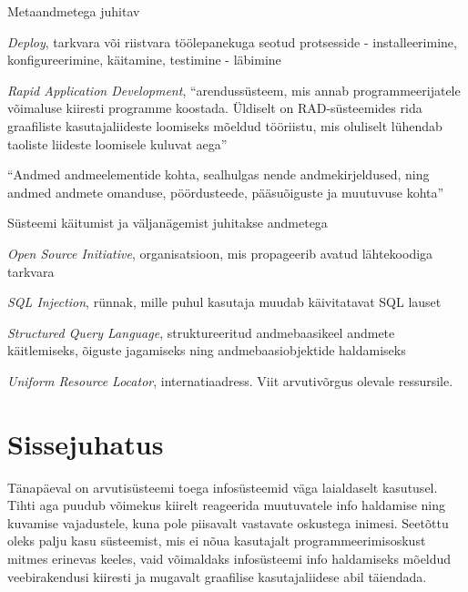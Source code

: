 \documentclass[a4paper,12pt]{article} %
\begin{document}
\begin{labeling}{Metaandmetega juhitav}
\item [Juurutama] \textit{Deploy}, tarkvara või riistvara töölepanekuga seotud protsesside - installeerimine, konfigureerimine, käitamine, testimine - läbimine \cite{Vallaste}
\item [Kiirprogrammeerimine] \textit{Rapid Application Development}, ``arendussüsteem, mis annab programmeerijatele võimaluse kiiresti programme koostada. Üldiselt on RAD-süsteemides rida graafiliste kasutajaliideste loomiseks mõeldud tööriistu, mis oluliselt lühendab taoliste liideste loomisele kuluvat aega'' \cite{Vallaste}
\item [Metaandmed] ``Andmed andmeelementide kohta, sealhulgas nende andmekirjeldused, ning andmed andmete omanduse, pöördusteede, pääsuõiguste ja muutuvuse kohta'' \cite{metaAndmed}
\item [Metaandmetega juhitav] Süsteemi käitumist ja väljanägemist juhitakse andmetega
\item [OSI] \textit{Open Source Initiative}, organisatsioon, mis propageerib avatud lähtekoodiga tarkvara
\item [SQL süstimine] \textit{SQL Injection}, rünnak, mille puhul kasutaja muudab käivitatavat SQL lauset
\item [SQL] \textit{Structured Query Language}, struktureeritud andmebaasikeel andmete käitlemiseks, õiguste jagamiseks ning andmebaasiobjektide haldamiseks
\item [URL] \textit{Uniform Resource Locator}, internatiaadress. Viit arvutivõrgus olevale ressursile. \cite{Vallaste}
\end{labeling}
\pagebreak
\tableofcontents
\newpage
\listoffigures
\pagebreak
\listoftables
\pagebreak
\section{Sissejuhatus}
\label{Sissejuhatus} %
Tänapäeval on arvutisüsteemi toega infosüsteemid väga laialdaselt kasutusel. Tihti aga puudub võimekus kiirelt reageerida muutuvatele info haldamise ning kuvamise vajadustele, kuna pole piisavalt vastavate oskustega inimesi. Seetõttu oleks palju kasu süsteemist, mis ei nõua kasutajalt programmeerimisoskust mitmes erinevas keeles, vaid võimaldaks infosüsteemi info haldamiseks mõeldud veebirakendusi kiiresti ja mugavalt graafilise kasutajaliidese abil täiendada.
\end{document}
